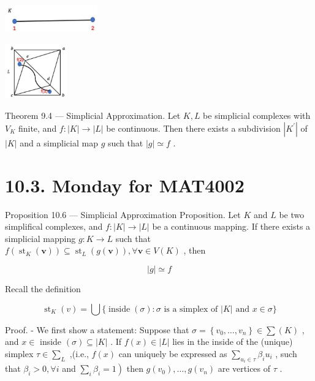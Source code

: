 \begin{center}
\includegraphics[max width=0.3\textwidth]{images/bo_d2bcsrref24c73avs720_97_437_1484_365_109_0.jpg}
\end{center}
\hspace*{3em} 

\begin{center}
\includegraphics[max width=0.2\textwidth]{images/bo_d2bcsrref24c73avs720_97_928_1430_297_262_0.jpg}
\end{center}
\hspace*{3em} 

Theorem 9.4 — Simplicial Approximation. Let \(K,L\) be simplicial complexes with \({V}_{K}\) finite, and \(f : \left| K\right|  \rightarrow  \left| L\right|\) be continuous. Then there exists a subdivision \(\left| {K}^{\prime }\right|\) of \(\left| K\right|\) and a simplicial map \(g\) such that \(\left| g\right|  \simeq  f\) .

\section*{10.3. Monday for MAT4002}

Proposition 10.6 — Simplicial Approximation Proposition. Let \(K\) and \(L\) be two simplifical complexes, and \(f : \left| K\right|  \rightarrow  \left| L\right|\) be a continuous mapping. If there exists a simplicial mapping \(g : K \rightarrow  L\) such that \(f\left( {{\operatorname{st}}_{K}\left( \mathbf{v}\right) }\right)  \subseteq  {\operatorname{st}}_{L}\left( {g\left( \mathbf{v}\right) }\right) ,\forall \mathbf{v} \in  V\left( K\right)\) , then

\[
\left| g\right|  \simeq  f
\]

Recall the definition

\[
{\operatorname{st}}_{K}\left( v\right)  = \bigcup \{ \operatorname{inside}\left( \sigma \right)  : \sigma \text{ is a simplex of }\left| K\right| \text{ and }x \in  \sigma \}
\]

Proof. - We first show a statement: Suppose that \(\sigma  = \left\{  {{v}_{0},\ldots ,{v}_{n}}\right\}   \in  \sum \left( K\right)\) , and \(x \in\) inside \(\left( \sigma \right)  \subseteq  \left| K\right|\) . If \(f\left( x\right)  \in  \left| L\right|\) lies in the inside of the (unique) simplex \(\tau  \in  {\sum }_{L}\) ,(i.e., \(f\left( x\right)\) can uniquely be expressed as \(\mathop{\sum }\limits_{{{u}_{i} \in  \tau }}{\beta }_{i}{u}_{i}\) , such that \({\beta }_{i} > 0,\forall i\) and \(\left. {\mathop{\sum }\limits_{i}{\beta }_{i} = 1}\right)\) then \(g\left( {v}_{0}\right) ,\ldots ,g\left( {v}_{n}\right)\) are vertices of \(\tau\) .

